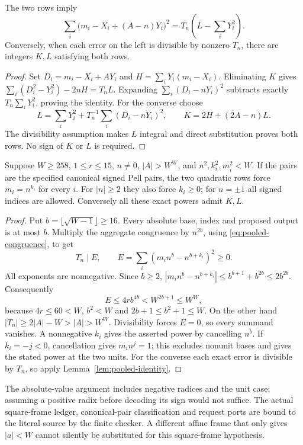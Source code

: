 \begin{lemma}\label{lem:pooled-identity}
The two rows imply
\[
 \sum_i\bigl(m_i-X_i+(A-n)Y_i\bigr)^2
 =T_n\left(L-\sum_iY_i^2\right).
\]
Conversely, when each error on the left is divisible by nonzero $T_n$,
there are integers $K,L$ satisfying both rows.
\end{lemma}
\begin{proof}
Set $D_i=m_i-X_i+AY_i$ and $H=\sum_iY_i(m_i-X_i)$.
Eliminating $K$ gives
$\sum_i(D_i^2-Y_i^2)-2nH=T_nL$.
Expanding $\sum_i(D_i-nY_i)^2$ subtracts exactly
$T_n\sum_iY_i^2$, proving the identity. For the converse choose
\[
 L=\sum_iY_i^2+T_n^{-1}\sum_i(D_i-nY_i)^2,
 \qquad K=2H+(2A-n)L.
\]
The divisibility assumption makes $L$ integral and direct substitution
proves both rows. No sign of $K$ or $L$ is required.
\end{proof}

\begin{theorem}
\label{thm:pooled-exactness}
Suppose $W\ge258$, $1\le r\le15$, $n\ne0$, $|A|>W^W$, and
$n^2,k_i^2,m_i^2<W$. If the pairs are the specified canonical signed
Pell pairs, the two quadratic rows force $m_i=n^{k_i}$ for every $i$.
For $|n|\ge2$ they also force $k_i\ge0$; for $n=\pm1$ all signed
indices are allowed. Conversely all these exact powers admit $K,L$.
\end{theorem}
\begin{proof}
Put $b=\lfloor\sqrt{W-1}\rfloor\ge16$. Every absolute base, index
and proposed output is at most $b$. Multiply the aggregate congruence
by $n^{2b}$, using \eqref{eq:pooled-congruence}, to get
\[
 T_n\mid E,\qquad
 E=\sum_i(m_in^b-n^{b+k_i})^2\ge0.
\]
All exponents are nonnegative. Since $b\ge2$,
$|m_in^b-n^{b+k_i}|\le b^{b+1}+b^{2b}\le2b^{2b}$.
Consequently
\[
 E\le4rb^{4b}<W^{2b+1}\le W^W,
\]
because $4r\le60<W$, $b^2<W$ and $2b+1\le b^2+1\le W$.
On the other hand
$|T_n|\ge2|A|-W>|A|>W^W$. Divisibility forces $E=0$,
so every summand vanishes. A nonnegative $k_i$ gives the asserted power
by cancelling $n^b$. If $k_i=-j<0$, cancellation gives $m_in^j=1$;
this excludes nonunit bases and gives the stated power at the two units.
For the converse each exact error is divisible by $T_n$, so apply
Lemma~\ref{lem:pooled-identity}.
\end{proof}
The absolute-value argument includes negative radices and the unit case;
assuming a positive radix before decoding its sign would not suffice.
The actual square-frame ledger, canonical-pair classification and
request ports are bound to the literal source by the finite checker.
A different affine frame that only gives $|a|<W$ cannot silently be
substituted for this square-frame hypothesis.

